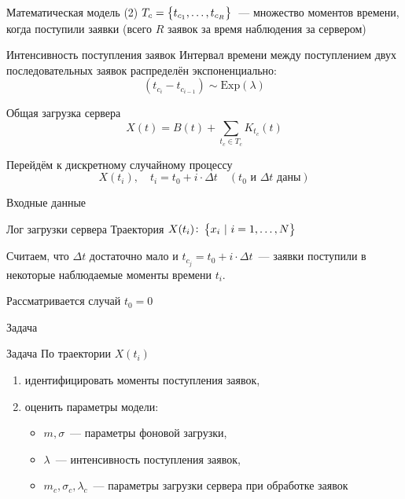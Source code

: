 \documentclass[utf8]{beamer}
\begin{document}
\begin{frame}{Математическая модель (2)}
$T_c = \cbr{ t_{c_1}, \ldots, t_{c_R} }$~--- 
множество моментов времени, когда поступили заявки 
(всего $R$ заявок за время наблюдения за сервером)
\begin{block}{Интенсивность поступления заявок}
  Интервал времени между поступлением двух последовательных заявок распределён экспоненциально:
  $$(t_{c_i} - t_{c_{i-1}}) \sim \mathrm{Exp}(\lambda)$$
\end{block}
\begin{block}{Общая загрузка сервера}
  $$X(t) = B(t) + \sum\limits_{t_c \in T_c}K_{t_c}(t)$$
\end{block}
\begin{block}{Перейдём к дискретному случайному процессу}
  $$X(t_i), \quad t_i = t_0 + i \cdot \Delta t \quad 
    (t_0 \mathrm{\text{ и }} \Delta t \mathrm{\text{ даны}})$$
\end{block}
\end{frame}


\begin{frame}{Входные данные}
\begin{block}{Лог загрузки сервера}
  Траектория $X(t_i)\colon \cbr{ x_i \ \vert\ i = 1, \ldots, N }$
\end{block}
Считаем, что $\Delta t$ достаточно мало и $t_{c_j} = t_0 + i \cdot \Delta t$~---
заявки поступили в некоторые наблюдаемые моменты времени $t_i.$

Рассматривается случай $t_0 = 0$
\end{frame}


\begin{frame}{Задача}
\begin{block}{Задача}
  По траектории $X(t_i)$ 
  \begin{enumerate}
    \item идентифицировать моменты поступления заявок,
    \item оценить параметры модели:
      \begin{itemize}
        \item $m, \sigma$~--- параметры фоновой загрузки,
        \item $\lambda$~--- интенсивность поступления заявок,
        \item $m_c, \sigma_c, \lambda_c$~--- параметры загрузки сервера при обработке заявок
      \end{itemize}
  \end{enumerate}
\end{block}
\end{frame}
\end{document}
